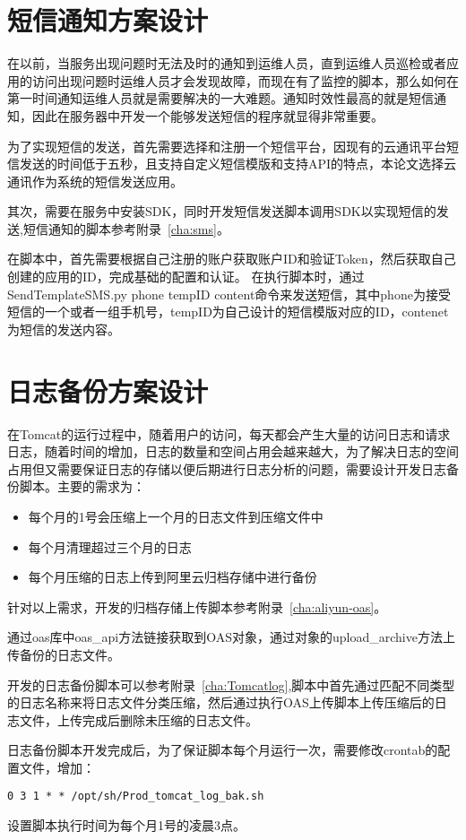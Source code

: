 \section{短信通知方案设计}

在以前，当服务出现问题时无法及时的通知到运维人员，直到运维人员巡检或者应用的访问出现问题时运维人员才会发现故障，而现在有了监控的脚本，那么如何在第一时间通知运维人员就是需要解决的一大难题。通知时效性最高的就是短信通知，因此在服务器中开发一个能够发送短信的程序就显得非常重要\cite{陈泰伟2007基于短信平台的服务器监控系统关键技术探讨}。

为了实现短信的发送，首先需要选择和注册一个短信平台，因现有的云通讯平台短信发送的时间低于五秒，且支持自定义短信模版和支持API的特点，本论文选择云通讯作为系统的短信发送应用。

其次，需要在服务中安装SDK，同时开发短信发送脚本调用SDK以实现短信的发送,短信通知的脚本参考附录~\ref{cha:sms}。

在脚本中，首先需要根据自己注册的账户获取账户ID和验证Token，然后获取自己创建的应用的ID，完成基础的配置和认证。
在执行脚本时，通过SendTemplateSMS.py phone tempID content命令来发送短信，其中phone为接受短信的一个或者一组手机号，tempID为自己设计的短信模版对应的ID，contenet为短信的发送内容。

\section{日志备份方案设计}

在Tomcat的运行过程中，随着用户的访问，每天都会产生大量的访问日志和请求日志，随着时间的增加，日志的数量和空间占用会越来越大，为了解决日志的空间占用但又需要保证日志的存储以便后期进行日志分析的问题，需要设计开发日志备份脚本。主要的需求为：
\begin{itemize}
\item 每个月的1号会压缩上一个月的日志文件到压缩文件中
\item 每个月清理超过三个月的日志
\item 每个月压缩的日志上传到阿里云归档存储中进行备份
\end{itemize}
针对以上需求，开发的归档存储上传脚本参考附录~\ref{cha:aliyun-oas}。

通过oas库中oas\_api方法链接获取到OAS对象，通过对象的upload\_archive方法上传备份的日志文件。

开发的日志备份脚本可以参考附录~\ref{cha:Tomcatlog},脚本中首先通过匹配不同类型的日志名称来将日志文件分类压缩，然后通过执行OAS上传脚本上传压缩后的日志文件，上传完成后删除未压缩的日志文件。

日志备份脚本开发完成后，为了保证脚本每个月运行一次，需要修改crontab的配置文件，增加：
\begin{lstlisting}[numbers=none]
0 3 1 * * /opt/sh/Prod_tomcat_log_bak.sh
\end{lstlisting}
设置脚本执行时间为每个月1号的凌晨3点。
\label{cha:Monitor-aliyun}
